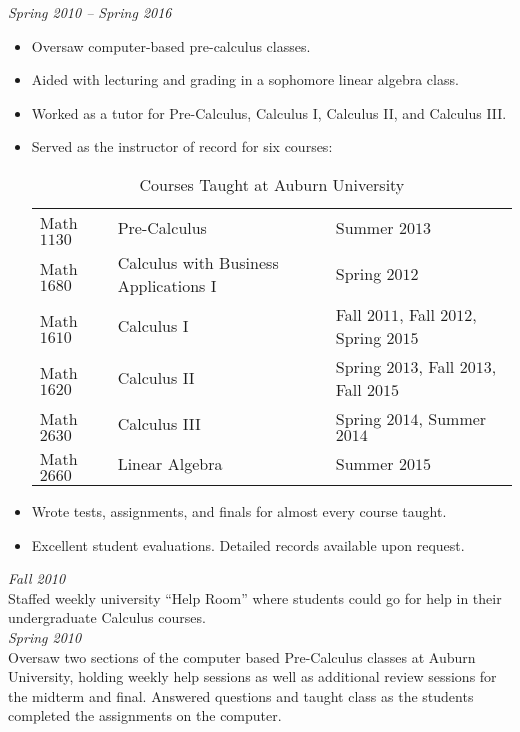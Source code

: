 \documentclass{article}
\begin{document}
 \hfill {\it Spring 2010 --
  Spring 2016\/}
\begin{itemize}[noitemsep]
\item Oversaw computer-based pre-calculus classes.
\item Aided with lecturing and grading in a sophomore
  linear algebra class.  
\item Worked as a tutor for Pre-Calculus, Calculus I, Calculus II, and
  Calculus III.  
\item Served as the instructor of record for six courses:
\begin{table}[H]
\begin{center}
\begin{tabular}{lll}
Math $1130$ & Pre-Calculus & Summer $2013$ \\
Math $1680$ & Calculus with Business Applications I & Spring $2012$ \\
Math $1610$ & Calculus I & Fall $2011$, Fall $2012$, Spring $2015$ \\
Math $1620$ & Calculus II & Spring $2013$, Fall $2013$, Fall $2015$ \\
Math $2630$ & Calculus III & Spring $2014$, Summer $2014$ \\
Math $2660$ & Linear Algebra & Summer $2015$ \\
[-1pc]
\end{tabular}
\end{center}
\caption{Courses Taught at Auburn University}%
\end{table}
\item Wrote tests, assignments, and finals for almost every course taught.
\item Excellent student evaluations. Detailed records available upon
  request.
\end{itemize}

 \hfill {\it Fall 2010\/} \\
Staffed weekly university ``Help Room'' where students could go for help in
their undergraduate Calculus courses. \\ 

 \hfill {\it Spring 2010} \\
Oversaw two sections of the computer based Pre-Calculus classes at Auburn
University, holding weekly help sessions as well as additional review sessions
for the midterm and final.  Answered questions and taught class as the
students completed the assignments on the computer. \\
\end{document}
